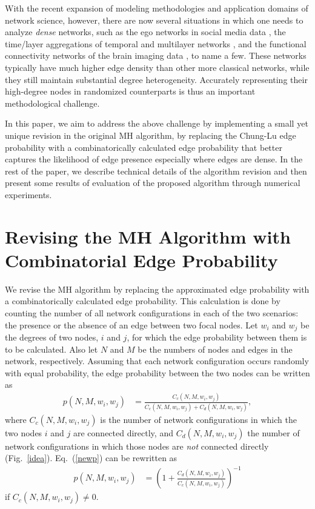 \documentclass{llncs}
\begin{document}
With the recent expansion of modeling methodologies and application
domains of network science, however, there are now several situations
in which one needs to analyze {\em dense} networks, such as the ego
networks in social media data \cite{leskovec2012learning}, the
time/layer aggregations of temporal and multilayer networks
\cite{holme2012temporal,kivela2014multilayer}, and the functional
connectivity networks of the brain imaging data \cite{zamani2017}, to
name a few. These networks typically have much higher edge density
than other more classical networks, while they still maintain
substantial degree heterogeneity. Accurately representing their
high-degree nodes in randomized counterparts is thus an important
methodological challenge.

In this paper, we aim to address the above challenge by implementing a
small yet unique revision in the original MH algorithm, by replacing
the Chung-Lu edge probability with a combinatorically calculated edge
probability that better captures the likelihood of edge presence
especially where edges are dense. In the rest of the paper, we
describe technical details of the algorithm revision and then present
some results of evaluation of the proposed algorithm through numerical
experiments.

\section{Revising the MH Algorithm with Combinatorial Edge Probability}

We revise the MH algorithm by replacing the approximated edge
probability with a combinatorically calculated edge probability. This
calculation is done by counting the number of all network
configurations in each of the two scenarios: the presence or the
absence of an edge between two focal nodes. Let $w_i$ and $w_j$ be the
degrees of two nodes, $i$ and $j$, for which the edge probability
between them is to be calculated. Also let $N$ and $M$ be the numbers
of nodes and edges in the network, respectively. Assuming that each
network configuration occurs randomly with equal probability, the edge
probability between the two nodes can be written as
\begin{align}
p(N, M, w_i, w_j) &= \frac{C_c(N, M, w_i, w_j)}{C_c(N, M, w_i, w_j) + C_d(N, M, w_i, w_j)} , \label{newp}
\end{align}
where $C_c(N, M, w_i, w_j)$ is the number of network configurations in
which the two nodes $i$ and $j$ are connected directly, and $C_d(N, M,
w_i, w_j)$ the number of network configurations in which those nodes
are {\em not} connected directly (Fig.~\ref{idea}). Eq.~(\ref{newp})
can be rewritten as
\begin{align}
p(N, M, w_i, w_j) &= \left( 1 + \frac{C_d(N, M, w_i, w_j)}{C_c(N, M, w_i, w_j)} \right)^{-1}\label{newp2}
\end{align}
if $C_c(N, M, w_i, w_j) \ne 0$.
\end{document}
